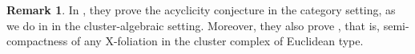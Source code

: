 \documentclass[11pt,reqno]{amsart}
\theoremstyle{plain}
\newtheorem{lemma}[theorem]{Lemma}
\theoremstyle{definition}
\newtheorem{remark}[theorem]{Remark}
\numberwithin{equation}{section}
\newcommand\<{\langle}
\renewcommand\>{\rangle}
\newcommand\Add{\operatorname{add}}
\newcommand\Ind{\operatorname{Ind}}
\newcommand{\on}[1]{\operatorname{#1}}
\def\sink{X}
\newcommand{\Dflow}[1]{\on{Evo}^{\downarrow}_{#1}}
\newcommand{\Uflow}[1]{\on{Evo}^{\uparrow}_{#1}}
\newcommand{\flowD}[1]{\on{Evo}_{\downarrow}^{#1}}
\newcommand{\flowU}[1]{\on{Evo}_{\uparrow}^{#1}}
\newcommand{\pcts}[1]{\mathbf{#1}}%
\newcommand{\ccpt}[1]{\mathrm{#1}}%
\def\xevo{\ccpt{X}}%
\begin{document}









\begin{remark}
    In \cite{HZ}, they prove the acyclicity conjecture \cite[Conj.~1.7]{QT} in the category setting, as we do in  in the cluster-algebraic setting.  
    Moreover, they also prove \cite[Conj.~1.8]{QT}, that is, semi-compactness of any $\xevo$-foliation in the cluster complex of Euclidean type.
\end{remark}
\end{document}
